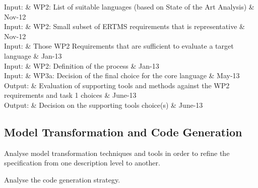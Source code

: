 \documentclass{template/openetcs_article}
\begin{document}
\begin{inoutput}
Input: & WP2: List of suitable languages (based on State of the Art Analysis) & Nov-12 \\
Input: & WP2: Small subset of ERTMS requirements that is representative & Nov-12 \\
Input: & Those WP2 Requirements that are sufficient to evaluate a target language & Jan-13 \\
Input: & WP2: Definition of the process & Jan-13 \\
Input: & WP3a: Decision of the final choice for the core language & May-13 \\
\hline
Output: & Evaluation of supporting tools and methods against the WP2 requirements and task 1 choices & June-13 \\
Output: & Decision on the supporting tools choice(s) & June-13 \\
\end{inoutput}


\subsection{Model Transformation and Code Generation}

Analyse model transformation techniques and tools in order to refine the specification from one description level to another.



Analyse the code generation strategy.
\end{document}
